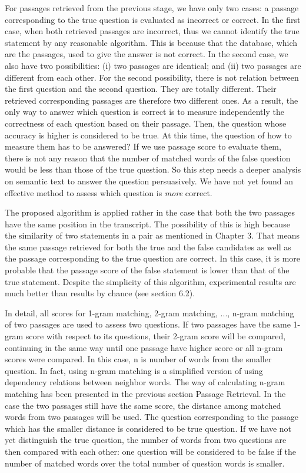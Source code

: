 For passages retrieved from the previous stage, we have only two cases: a passage corresponding to the true question is evaluated as incorrect or correct. In the first case, when both retrieved passages are incorrect, thus we cannot identify the true statement by any reasonable algorithm. This is because that the database, which are the passages, used to give the answer is not correct. In the second case, we also have two possibilities: (i) two passages are identical; and (ii) two passages are different from each other. For the second possibility, there is not relation between the first question and the second question. They are totally different. Their retrieved corresponding passages are therefore two different ones. As a result, the only way to answer which question is correct is to measure independently the correctness of each question based on their passage. Then, the question whose accuracy is higher is considered to be true. At this time, the question of how to measure them has to be answered? If we use passage score to evaluate them, there is not any reason that the number of matched words of the false question would be less than those of the true question. So this step needs a deeper analysis on semantic text to answer the question persuasively. We have not yet found an effective method to assess which question is \textit{more} correct.

The proposed algorithm is applied rather in the case that both the two passages have the same position in the transcript. The possibility of this is high because the similarity of two statements in a pair as mentioned in Chapter 3. That means the same passage retrieved for both the true and the false candidates as well as the passage corresponding to the true question are correct. In this case, it is more probable that the passage score of the false statement is lower than that of the true statement. Despite the simplicity of this algorithm, experimental results are much better than results by chance (see section 6.2).

In detail, all scores for 1-gram matching, 2-gram matching, ..., n-gram matching of two passages are used to assess two questions. If two passages have the same 1-gram score with respect to its questions, their 2-gram score will be compared, continuing in the same way until one passage have higher score or all n-gram scores were compared. In this case, n is number of words from the smaller question. In fact, using n-gram matching is a simplified version of using dependency relations between neighbor words. The way of calculating n-gram matching has been presented in the previous section Passage Retrieval. In the case the two passages still have the same score, the distance among matched words from two passages will be used. The question corresponding to the passage which has the smaller distance is considered to be true question. If we have not yet distinguish the true question, the number of words from two questions are then compared with each other: one question will be considered to be false if the number of matched words over the total number of question words is smaller.


